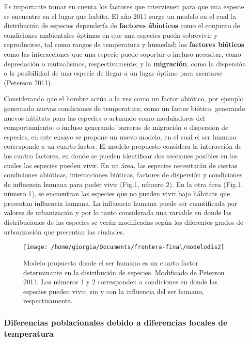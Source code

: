 \documentclass[]{article}
\begin{document}
Es importante tomar en cuenta los factores que intervienen para que una
especie se encuentre en el lugar que habita. El año 2011 surge un modelo
en el cual la distribución de especies dependería de \textbf{factores
ábioticos} como el conjunto de condiciones ambientales óptimas en que
una especies pueda sobrevivir y reproducirse, tal como rangos de
temperatura y humedad; los \textbf{factores bióticos} como las
interacciones que una especie puede soportar o incluso necesitar, como
depredación o mutualismos, respectivamente; y la \textbf{migración},
como la dispersión o la posibilidad de una especie de llegar a un lugar
óptimo para asentarse (Peterson 2011).

Considerando que el hombre actúa a la vez como un factor abiótico, por
ejemplo generando nuevas condiciones de temperatura; como un factor
biótico, generando nuevos hábitats para las especies o actuando como
moduladores del comportamiento; o incluso generando barreras de
migración o dispersion de especies, en este ensayo se propone un nuevo
modelo, en el cual el ser humano corresponde a un cuarto factor. El
modelo propuesto considera la interacción de los cuatro factores, en
donde se pueden identificar dos secciones posibles en los cuales las
especies pueden vivir. En un área, las especies necesitarán de ciertas
condiciones abióticas, interacciones bióticas, factores de dispersión y
condiciones de influencia humana para poder vivir (Fig.1, número 2). En
la otra área (Fig.1, número 1), se encuentran las especies que no pueden
vivir bajo hábitats que presentan influencia humana. La influencia
humana puede ser cuantificada por valores de urbanización y por lo tanto
considerada una variable en donde las distribuciones de las especies se
verán modificadas según los diferentes grados de urbanización que
presentan las ciudades.

\begin{figure}
\texttt{[image: /home/giorgia/Documents/frontera-final/modelodis2]} \caption{Modelo propuesto donde el ser humano es un cuarto factor determinante en la distribución de especies. Modificado de Peterson 2011. Los números 1 y 2 corresponden a condiciones en donde las especies pueden vivir, sin y con la influencia del ser humano, respectivamente.}\label{fig:unnamed-chunk-1}
\end{figure}

\subsubsection{Diferencias poblacionales debido a diferencias locales de
temperatura}\label{diferencias-poblacionales-debido-a-diferencias-locales-de-temperatura}
\end{document}
